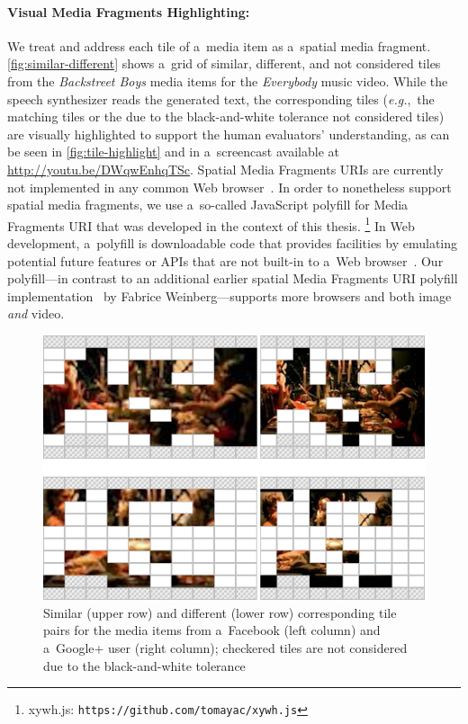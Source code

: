 \paragraph{Visual Media Fragments Highlighting:}

We treat and address each tile of a~media item
as a~spatial media fragment. \autoref{fig:similar-different}
shows a~grid of similar, different, and not considered tiles
from the \emph{Backstreet Boys} media items for the \emph{Everybody} music video.
While the speech synthesizer reads the generated text,
the corresponding tiles (\emph{e.g.},~the matching tiles
or the due to the black-and-white tolerance not considered tiles)
are visually highlighted to support the human evaluators' understanding,
as can be seen in \autoref{fig:tile-highlight}
and in a~screencast available at \url{http://youtu.be/DWqwEnhqTSc}.
Spatial Media Fragments URIs are currently not implemented
in any common Web browser~\cite{weinberg2013polyfill}.
In order to nonetheless support spatial media fragments,
we use a~so-called JavaScript polyfill for Media Fragments URI
that was developed in the context of this thesis.%
\footnote{xywh.js: \texttt{https://github.com/tomayac/xywh.js}}
In Web development, a~polyfill is downloadable code that provides facilities
by emulating potential future features or APIs
that are not built-in to a~Web browser~\cite{sharp2010polyfill}.
Our polyfill---in contrast to an additional earlier
spatial Media Fragments URI polyfill implementation~\cite{weinberg2013polyfill}
by Fabrice Weinberg---supports more browsers and both image \emph{and} video.

\begin{figure}[!ht]
  \centering
  \includegraphics[width=0.75\linewidth]{./similar-different.png}
  \caption[Similar and different corresponding tile pairs]{Similar (upper row) and different (lower row) corresponding tile pairs for the media items from a~Facebook (left column) and a~Google+ user (right column); checkered tiles are not considered due to the black-and-white tolerance}
  \label{fig:similar-different}
\end{figure}

